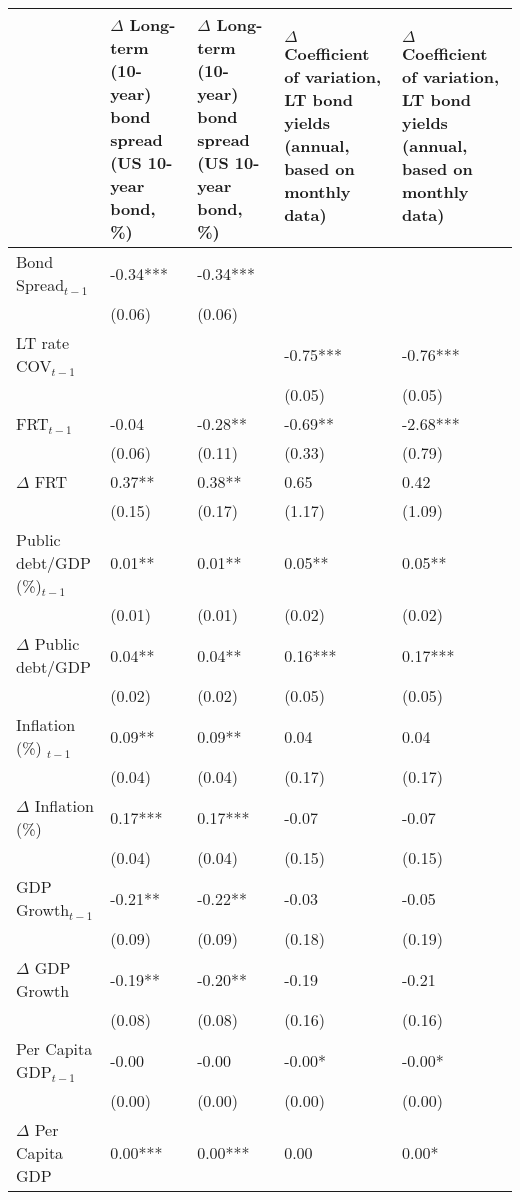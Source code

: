 \begingroup\tiny
\begin{tabular}{lp{3cm}p{3cm}p{3cm}p{3cm}}
  \hline
 & $\Delta$ Long-term (10-year) bond spread (US 10-year bond, \%) & $\Delta$ Long-term (10-year) bond spread (US 10-year bond, \%) & $\Delta$ Coefficient of variation, LT bond yields (annual, based on monthly data) & $\Delta$ Coefficient of variation, LT bond yields (annual, based on monthly data) \\ 
  \hline
Bond Spread$_{t-1}$ & -0.34*** & -0.34*** &  &  \\ 
   & (0.06) & (0.06) &  &  \\ 
  LT rate COV$_{t-1}$ &  &  & -0.75*** & -0.76*** \\ 
   &  &  & (0.05) & (0.05) \\ 
  FRT$_{t-1}$ & -0.04 & -0.28** & -0.69** & -2.68*** \\ 
   & (0.06) & (0.11) & (0.33) & (0.79) \\ 
  $\Delta$ FRT & 0.37** & 0.38** & 0.65 & 0.42 \\ 
   & (0.15) & (0.17) & (1.17) & (1.09) \\ 
  Public debt/GDP (\%)$_{t-1}$ & 0.01** & 0.01** & 0.05** & 0.05** \\ 
   & (0.01) & (0.01) & (0.02) & (0.02) \\ 
  $\Delta$ Public debt/GDP & 0.04** & 0.04** & 0.16*** & 0.17*** \\ 
   & (0.02) & (0.02) & (0.05) & (0.05) \\ 
  Inflation (\%) $_{t-1}$ & 0.09** & 0.09** & 0.04 & 0.04 \\ 
   & (0.04) & (0.04) & (0.17) & (0.17) \\ 
  $\Delta$ Inflation (\%) & 0.17*** & 0.17*** & -0.07 & -0.07 \\ 
   & (0.04) & (0.04) & (0.15) & (0.15) \\ 
  GDP Growth$_{t-1}$ & -0.21** & -0.22** & -0.03 & -0.05 \\ 
   & (0.09) & (0.09) & (0.18) & (0.19) \\ 
  $\Delta$ GDP Growth & -0.19** & -0.20** & -0.19 & -0.21 \\ 
   & (0.08) & (0.08) & (0.16) & (0.16) \\ 
  Per Capita GDP$_{t-1}$ & -0.00 & -0.00 & -0.00* & -0.00* \\ 
   & (0.00) & (0.00) & (0.00) & (0.00) \\ 
  $\Delta$ Per Capita GDP & 0.00*** & 0.00*** & 0.00 & 0.00* \\ 

\end{tabular}
